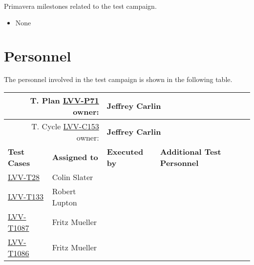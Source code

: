 \documentclass[DM,lsstdraft,STR,toc]{lsstdoc}
\begin{document}
Primavera milestones related to the test campaign.

\begin{itemize}
\item None
\end{itemize}


\newpage
\section{Personnel}
\label{sect:personnel}

The personnel involved in the test campaign is shown in the following table.

{\small
\begin{longtable}{p{3cm}p{3cm}p{3cm}p{6cm}}
\hline
\multicolumn{2}{r}{T. Plan \href{https://jira.lsstcorp.org/secure/Tests.jspa\#/testPlan/LVV-P71}{LVV-P71} owner:} &
\multicolumn{2}{l}{\textbf{ Jeffrey Carlin } }\\\hline
\multicolumn{2}{r}{T. Cycle \href{https://jira.lsstcorp.org/secure/Tests.jspa\#/testCycle/LVV-C153}{LVV-C153} owner:} &
\multicolumn{2}{l}{\textbf{
Jeffrey Carlin }
} \\\hline
\textbf{Test Cases} & \textbf{Assigned to} & \textbf{Executed by} & \textbf{Additional Test Personnel} \\ \hline
\href{https://jira.lsstcorp.org/secure/Tests.jspa#/testCase/LVV-T28}{LVV-T28}
& {\small Colin Slater } & {\small  } &
\begin{minipage}[]{6cm}
\smallskip
{\small  }
\medskip
\end{minipage}
\\ \hline
\href{https://jira.lsstcorp.org/secure/Tests.jspa#/testCase/LVV-T133}{LVV-T133}
& {\small Robert Lupton } & {\small  } &
\begin{minipage}[]{6cm}
\smallskip
{\small  }
\medskip
\end{minipage}
\\ \hline
\href{https://jira.lsstcorp.org/secure/Tests.jspa#/testCase/LVV-T1087}{LVV-T1087}
& {\small Fritz Mueller } & {\small  } &
\begin{minipage}[]{6cm}
\smallskip
{\small  }
\medskip
\end{minipage}
\\ \hline
\href{https://jira.lsstcorp.org/secure/Tests.jspa#/testCase/LVV-T1086}{LVV-T1086}
& {\small Fritz Mueller } & {\small  } &
\begin{minipage}[]{6cm}
\smallskip
{\small  }
\medskip
\end{minipage}
\\ \hline

\end{longtable}}
\end{document}
